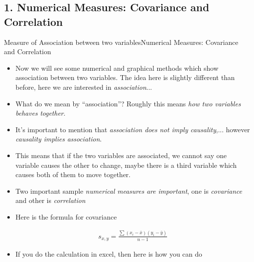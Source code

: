 \documentclass[8pt, usepdftitle=false]{beamer}
\begin{document}
\subsection{1. Numerical Measures: Covariance and Correlation}
\frame{\subsectionpage}

\begin{frame}[allowframebreaks]{Measure of Association between two variables}{Numerical Measures: Covariance and Correlation}
  
\begin{itemize}
  \item Now we will see some numerical and graphical methods which show association between two variables. The idea here is slightly different than before, here we are interested in \emph{association}...

  \item What do we mean by ``association''? Roughly this means \emph{how two variables behaves together}. 

  \item It's important to mention that \emph{association does not imply causality},... however \emph{causality implies association}.

  \item This means that if the two variables are associated, we cannot say one variable causes the other to change, maybe there is a third variable which causes both of them to move together.

  \item Two important sample \emph{numerical measures are important}, one is \emph{covariance} and other is \emph{correlation}

  \item Here is the formula for covariance


  \begin{align*}
    s_{x, y} = \frac{\sum\left(x_i-\bar{x}\right)\left(y_i-\bar{y}\right)}{n-1}
  \end{align*}

  \item If you do the calculation in excel, then here is how you can do

  \begin{table}[H]
  \centering


\end{table}
\end{itemize}
\end{frame}
\end{document}
